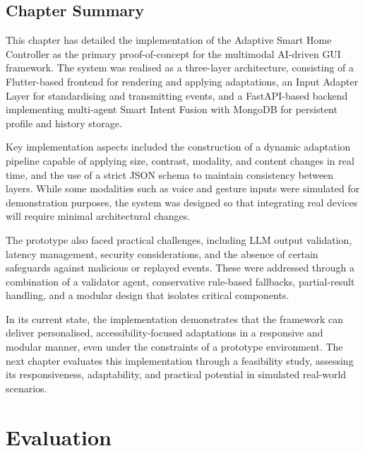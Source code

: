 \documentclass[openany]{book}
\begin{document}
\section{Chapter Summary}
This chapter has detailed the implementation of the Adaptive Smart Home Controller as the primary proof-of-concept for the multimodal AI-driven GUI framework. The system was realised as a three-layer architecture, consisting of a Flutter-based frontend for rendering and applying adaptations, an Input Adapter Layer for standardising and transmitting events, and a FastAPI-based backend implementing multi-agent Smart Intent Fusion with MongoDB for persistent profile and history storage.

Key implementation aspects included the construction of a dynamic adaptation pipeline capable of applying size, contrast, modality, and content changes in real time, and the use of a strict JSON schema to maintain consistency between layers. While some modalities such as voice and gesture inputs were simulated for demonstration purposes, the system was designed so that integrating real devices will require minimal architectural changes.

The prototype also faced practical challenges, including LLM output validation, latency management, security considerations, and the absence of certain safeguards against malicious or replayed events. These were addressed through a combination of a validator agent, conservative rule-based fallbacks, partial-result handling, and a modular design that isolates critical components.

In its current state, the implementation demonstrates that the framework can deliver personalised, accessibility-focused adaptations in a responsive and modular manner, even under the constraints of a prototype environment. The next chapter evaluates this implementation through a feasibility study, assessing its responsiveness, adaptability, and practical potential in simulated real-world scenarios.

\chapter{Evaluation}
\label{ch:evaluation}
\end{document}
